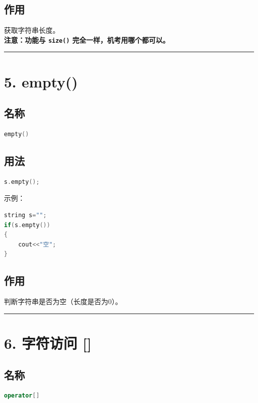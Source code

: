 \documentclass[10pt,twocolumn]{extarticle}
\begin{document}
\subsection{作用}
获取字符串长度。\\
\textbf{注意：功能与 \texttt{size()} 完全一样，机考用哪个都可以。}

\noindent\rule{\linewidth}{0.4pt}

\section{5. empty()}

\subsection{名称}
\begin{lstlisting}[language=C++]
empty()
\end{lstlisting}

\subsection{用法}
\begin{lstlisting}[language=C++]
s.empty();
\end{lstlisting}
示例：
\begin{lstlisting}[language=C++]
string s="";
if(s.empty())
{
    cout<<"空";
}
\end{lstlisting}

\subsection{作用}
判断字符串是否为空（长度是否为0）。

\noindent\rule{\linewidth}{0.4pt}

\section{6. 字符访问 []}

\subsection{名称}
\begin{lstlisting}[language=C++]
operator[]
\end{lstlisting}
\end{document}

